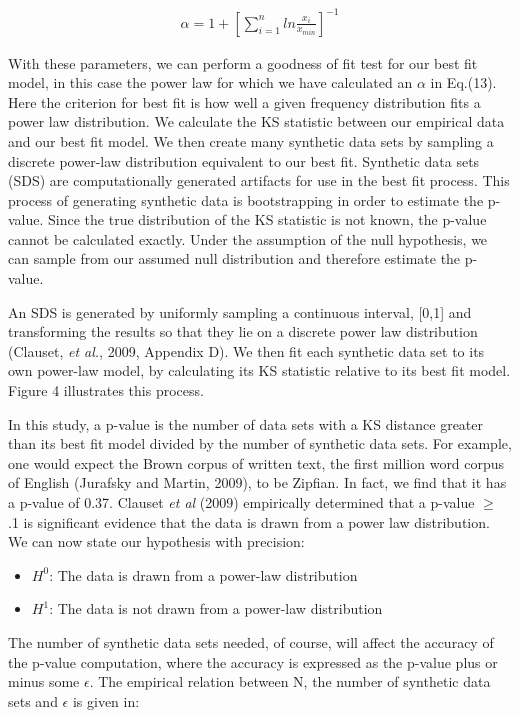 \documentclass[12pt]{article}
\begin{document}
\begin{align}
\alpha = 1 +\left[ \sum_{i=1}^{n}ln\frac{x_i}{x_{min}}\right]^{-1}
\end{align}

With these parameters, we can perform a goodness of fit test for our best fit model, in this case the power law for which we have calculated an $\alpha$ in Eq.(13). Here the criterion for best fit is how well a given frequency distribution fits a power law distribution. We calculate the KS statistic between our empirical data and our best fit model.  We then create many synthetic data sets by sampling a discrete power-law distribution equivalent to our best fit. Synthetic data sets (SDS) are computationally generated artifacts for use in the best fit process. 
This process of generating synthetic data is bootstrapping in order to estimate the p-value.  Since the true distribution of the KS statistic is not known, the p-value cannot be calculated exactly. Under the assumption of the null hypothesis, we can sample from our assumed null distribution and therefore estimate the p-value.

An SDS is generated by uniformly sampling a continuous interval, [0,1]  and transforming the results so that they lie on a discrete power law distribution (Clauset, \emph{et al.}, 2009, Appendix D).  We then fit each synthetic data set to its own power-law model, by calculating its KS statistic relative to its best fit model. Figure 4 illustrates this process.  

In this study, a p-value is the number of data sets with a KS distance greater than its best fit model divided by the number of synthetic data sets.   For example, one would expect the Brown corpus of written text, the first million word corpus of English (Jurafsky and Martin, 2009), to be Zipfian.  In fact, we find that it has a p-value of 0.37.  Clauset \emph{et al} (2009) empirically determined that a p-value $\geq$ .1 is significant evidence that the data is drawn from a power law distribution.  We can now state our hypothesis with precision:

\begin{itemize}
\item $H^0$: The data is drawn from a power-law distribution
\item $H^1$: The data is not drawn from a power-law distribution
\end{itemize}

The number of synthetic data sets needed, of course, will affect the accuracy of the p-value computation, where the accuracy is expressed as the p-value plus or minus some $\epsilon$. The empirical relation between N, the number of synthetic data sets and  $\epsilon$ is given in: 
\end{document}
